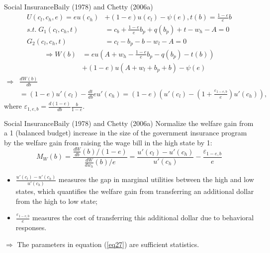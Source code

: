 \documentclass{beamer}
\begin{document}
\begin{frame}{Social Insurance}{Baily (1978) and Chetty (2006a)}
	\begin{equation}
		\begin{aligned}
			U(c_l,c_h,e) = eu(c_h) &+ (1-e)u(c_l) - \psi(e), t(b) = \frac{1-e}{e}b \\
			s.t.\; G_1(c_l,c_h,t) &= c_b + \frac{1-e}{e}b_p +q(b_p) + t - w_h - A =0 \\
			G_2(c_l,c_h,t) &= c_l - b_p - b - w_l - A =0
		\end{aligned}
	\end{equation}
	\begin{equation}\nonumber
		\begin{aligned}
			\Rightarrow W(b)&=eu\left(A+w_h-\frac{1-e}{e}b_p-q(b_p)-t(b)\right)\\
			&+(1-e)u(A+w_l+b_p+b)-\psi(e)
		\end{aligned}
	\end{equation}
	\begin{equation}\nonumber
		\begin{aligned}
			\Rightarrow & \frac{dW(b)}{db} \\
			&= (1-e)u'(c_l) - \frac{dt}{db}eu'(c_h) = (1-e)\left(u'(c_l)-\left(1+\frac{\varepsilon_{1-e,b}}{e}\right)u'(c_h)\right),
		\end{aligned}
	\end{equation}
	where $\varepsilon_{1,e,b} = \frac{d(1-e)}{db}\frac{b}{1-e}$.
\end{frame}
\begin{frame}{Social Insurance}{Baily (1978) and Chetty (2006a)}
	Normalize the welfare gain from a 1 (balanced budget) increase in the size of the government insurance program by the welfare gain from raising the wage bill in the high state by 1:
	\begin{equation}\label{eq27}
		M_W(b) = \frac{\frac{dW}{db}(b)/(1-e)}{\frac{dW}{dw_h}(b)/e}=\frac{u'(c_l)-u'(c_h)}{u'(c_h)}-\frac{\varepsilon_{1-e,b}}{e}
	\end{equation}
	\begin{itemize}
		\item $\frac{u'(c_l)-u'(c_h)}{u'(c_h)}$ measures the gap in marginal utilities between the high and low states, which quantifies the welfare gain from transferring an additional dollar from the high to low state;
		\item $\frac{\varepsilon_{1-e,b}}{e}$ measures the cost of transferring this additional dollar due to behavioral responses.
	\end{itemize}
	\medskip

	$\Rightarrow$ The parameters in equation (\ref{eq27}) are sufficient statistics.
\end{frame}
\end{document}
